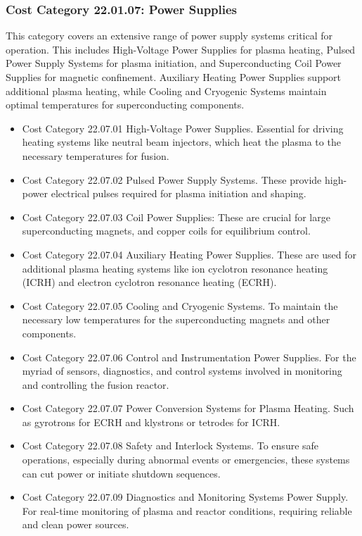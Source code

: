 \subsubsection*{Cost Category 22.01.07: Power Supplies} 

This category covers an extensive range of power supply systems critical for operation. This includes High-Voltage Power Supplies for plasma heating, Pulsed Power Supply Systems for plasma initiation, and Superconducting Coil Power Supplies for magnetic confinement. Auxiliary Heating Power Supplies support additional plasma heating, while Cooling and Cryogenic Systems maintain optimal temperatures for superconducting components. 


\begin{itemize}
    \item Cost Category 22.07.01 High-Voltage Power Supplies. Essential for driving heating systems like neutral beam injectors, which heat the plasma to the necessary temperatures for fusion.
    \item Cost Category 22.07.02 Pulsed Power Supply Systems. These provide high-power electrical pulses required for plasma initiation and shaping.
    \item Cost Category 22.07.03 Coil Power Supplies: These are crucial for large superconducting magnets, and copper coils for equilibrium control.
    \item Cost Category 22.07.04 Auxiliary Heating Power Supplies. These are used for additional plasma heating systems like ion cyclotron resonance heating (ICRH) and electron cyclotron resonance heating (ECRH).
    \item Cost Category 22.07.05 Cooling and Cryogenic Systems. To maintain the necessary low temperatures for the superconducting magnets and other components.
    \item Cost Category 22.07.06 Control and Instrumentation Power Supplies. For the myriad of sensors, diagnostics, and control systems involved in monitoring and controlling the fusion reactor.
    \item Cost Category 22.07.07 Power Conversion Systems for Plasma Heating. Such as gyrotrons for ECRH and klystrons or tetrodes for ICRH.
    \item Cost Category 22.07.08 Safety and Interlock Systems. To ensure safe operations, especially during abnormal events or emergencies, these systems can cut power or initiate shutdown sequences.
    \item Cost Category  22.07.09 Diagnostics and Monitoring Systems Power Supply. For real-time monitoring of plasma and reactor conditions, requiring reliable and clean power sources.
\end{itemize}

